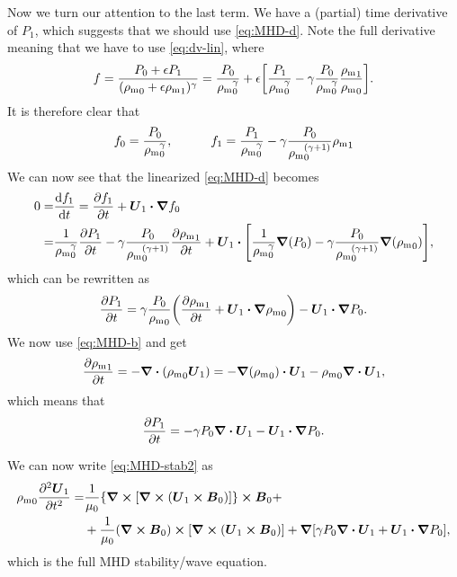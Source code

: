 \documentclass[11pt,a4paper, 
swedish, english %
]{article}
\newcommand{\rhom}{\ensuremath{{\rho_{\text{m}}}}}
\begin{document}
Now we turn our attention to the last term. We have a (partial) time
derivative of $P_1$, which suggests that we should use
\eqref{eq:MHD-d}. Note the full derivative meaning that we have to
use \eqref{eq:dv-lin},
where
\begin{equation}
f=\frac{P_0+\epsilon P_1}{(\rhom_0+\epsilon\rhom_1)^\gamma}
=\frac{P_0}{\rhom_0^\gamma}+\epsilon\qty[
\frac{P_1}{\rhom_0^\gamma} 
-\gamma\frac{P_0}{\rhom_0^\gamma}\frac{\rhom_1}{\rhom_0}].
\end{equation}
It is therefore clear that
\begin{equation}
f_0=\frac{P_0}{\rhom_0^\gamma}
\qc\qquad
f_1=\frac{P_1}{\rhom_0^\gamma} 
-\gamma\frac{P_0}{\rhom_0^{(\gamma+1)}}\rhom_1
\end{equation}
We can now see that the linearized \eqref{eq:MHD-d} becomes
\begin{equation}
\begin{aligned}
0=&\dv{f_1}{t}=\pdv{f_1}{t}+\vb*U_1\vdot\grad{f_0}\\
=&\frac{1}{\rhom_0^\gamma}\pdv{P_1}{t}
-\gamma\frac{P_0}{\rhom_0^{(\gamma+1)}}\pdv{\rhom_1}{t}
+\vb*U_1\vdot\qty[\frac{1}{\rhom_0^{\gamma}}\grad(P_0)
-\gamma\frac{P_0}{\rhom_0^{(\gamma+1)}}\grad(\rhom_0)],
\end{aligned}
\end{equation}
which can be rewritten as
\begin{equation}
\pdv{P_1}{t}=\gamma\frac{P_0}{\rhom_0}
\qty(\pdv{\rhom_1}{t}+\vb*U_1\vdot\grad\rhom_0)
-\vb*U_1\vdot\grad P_0.
\end{equation}
We now use \eqref{eq:MHD-b} and get
\begin{equation}
\pdv{\rhom_1}{t}=-\div(\rhom_0\vb*U_1)
=-\grad(\rhom_0)\vdot\vb*U_1
-\rhom_0\div\vb*U_1,
\end{equation}
which means that
\begin{equation}
\pdv{P_1}{t}=-\gamma P_0\div\vb*U_1
-\vb*U_1\vdot\grad P_0.
\end{equation}

We can now write \eqref{eq:MHD-stab2} as
\begin{equation}\label{eq:MHD-wave}
\begin{aligned}
\rhom_0\pdv[2]{\vb*U_1}{t} =& 
\frac{1}{\mu_0}\qty{\curl\qty[\curl\qty(\vb*U_1\cross\vb*B_0)]}
\cross\vb*B_0+\\
&+\frac{1}{\mu_0}(\curl\vb*B_0)\cross
\qty[\curl\qty(\vb*U_1\cross\vb*B_0)]
+\grad\qty[\gamma P_0\div\vb*U_1+\vb*U_1\vdot\grad P_0],
\end{aligned}
\end{equation}
which is the full MHD stability/wave equation. 
\end{document}

